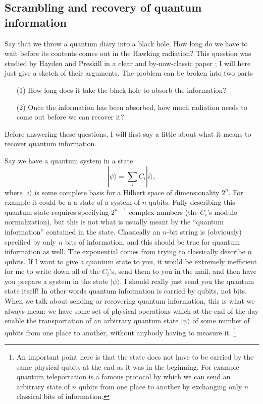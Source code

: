 \documentclass[12pt]{article}
\newcommand{\be}{\begin{equation}}
\newcommand{\ee}{\end{equation}}
\newcommand{\ran}{\rangle}
\begin{document}
\subsection{Scrambling and recovery of quantum information}\label{scrambsec}
Say that we throw a quantum diary into a black hole.  How long do we have to wait before its contents comes out in the Hawking radiation?  This question was studied by Hayden and Preskill in a clear and by-now-classic paper \cite{Hayden:2007cs}; I will here just give a sketch of their arguments.  The problem can be broken into two parts
\begin{itemize}
\item[(1)] How long does it take the black hole to absorb the information? 
\item[(2)] Once the information has been absorbed, how much radiation needs to come out before we can recover it? 
\end{itemize}
Before answering these questions, I will first say a little about what it means to recover quantum information.  

Say we have a quantum system in a state 
\be
|\psi\ran=\sum_i C_i |i\ran,
\ee
where $|i\ran$ is some complete basis for a Hilbert space of dimensionality $2^n$.  For example it could be a a state of a system of $n$ qubits.  Fully describing this quantum state requires specifying $2^{n-1}$ complex numbers (the $C_i$'s modulo normalization), but this is not what is usually meant by the ``quantum information'' contained in the state.  Classically an $n$-bit string is (obviously) specified by only $n$ bits of information, and this should be true for quantum information as well. The exponential comes from trying to classically describe $n$ qubits.  If I want to give a quantum state to you, it would be extremely inefficient for me to write down all of the $C_i$'s, send them to you in the mail, and then have you prepare a system in the state $|\psi\ran$.  I should really just send you the quantum state itself!  In other words quantum information is carried by qubits, not bits.  When we talk about sending or recovering quantum information, this is what we always mean: we have some set of physical operations which at the end of the day enable the transportation of an arbitrary quantum state $|\psi\ran$ of some number of qubits from one place to another, without anybody having to measure it. \footnote{An important point here is that the state does not have to be carried by the same physical qubits at the end as it was in the beginning.  For example quantum teleportation \cite{PhysRevLett.70.1895} is a famous protocol by which we can send an arbitrary state of $n$ qubits from one place to another by exchanging only $n$ classical bits of information.}
\end{document}
